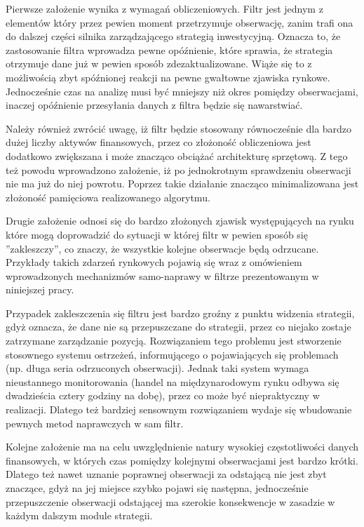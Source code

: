 \documentclass[a4paper,12pt,openany, DIV=calc, headsepline]{scrbook}
\begin{document}
Pierwsze założenie wynika z wymagań obliczeniowych. Filtr jest jednym z elementów który przez pewien moment przetrzymuje obserwację, zanim trafi ona do dalszej części silnika zarządzającego strategią inwestycyjną. Oznacza to, że zastosowanie filtra wprowadza pewne opóźnienie, które sprawia, że strategia otrzymuje dane już w pewien sposób zdezaktualizowane. Wiąże się to z możliwością  zbyt spóźnionej reakcji na pewne gwałtowne zjawiska rynkowe. Jednocześnie czas na analizę musi być mniejszy niż okres pomiędzy obserwacjami, inaczej opóźnienie przesyłania danych z filtra będzie się nawarstwiać.

Należy również zwrócić uwagę, iż filtr będzie  stosowany równocześnie dla bardzo dużej liczby aktywów finansowych, przez co złożoność obliczeniowa jest dodatkowo zwiększana i może znacząco obciążać architekturę sprzętową. Z tego też powodu wprowadzono założenie, iż po jednokrotnym sprawdzeniu obserwacji nie ma już do niej powrotu. Poprzez takie działanie znacząco minimalizowana jest złożoność pamięciowa realizowanego algorytmu.

Drugie założenie odnosi się do bardzo złożonych zjawisk występujących na rynku które mogą doprowadzić do sytuacji w której filtr w pewien sposób się ''zakleszczy'', co znaczy, że wszystkie kolejne obserwacje będą odrzucane. Przykłady takich zdarzeń rynkowych  pojawią się wraz z omówieniem wprowadzonych mechanizmów samo-naprawy w filtrze prezentowanym w niniejszej pracy.

Przypadek zakleszczenia się filtru jest bardzo groźny z punktu widzenia strategii, gdyż oznacza, że dane nie są przepuszczane do strategii, przez co niejako zostaje zatrzymane zarządzanie pozycją. Rozwiązaniem tego problemu jest stworzenie stosownego systemu ostrzeżeń, informującego o pojawiających się problemach (np. długa seria odrzuconych obserwacji). Jednak taki system wymaga nieustannego monitorowania (handel na międzynarodowym rynku odbywa się dwadzieścia cztery godziny na dobę), przez co może być niepraktyczny w realizacji. Dlatego też bardziej sensownym rozwiązaniem wydaje się wbudowanie pewnych metod naprawczych w sam filtr.

Kolejne założenie ma na celu uwzględnienie natury wysokiej częstotliwości danych finansowych, w których czas pomiędzy kolejnymi obserwacjami jest bardzo krótki. Dlatego też nawet  uznanie poprawnej obserwacji za odstającą nie jest zbyt znaczące, gdyż na jej miejsce szybko pojawi się następna, jednocześnie przepuszczenie obserwacji odstającej ma szerokie konsekwencje w zasadzie w każdym dalszym module strategii.
\end{document}
